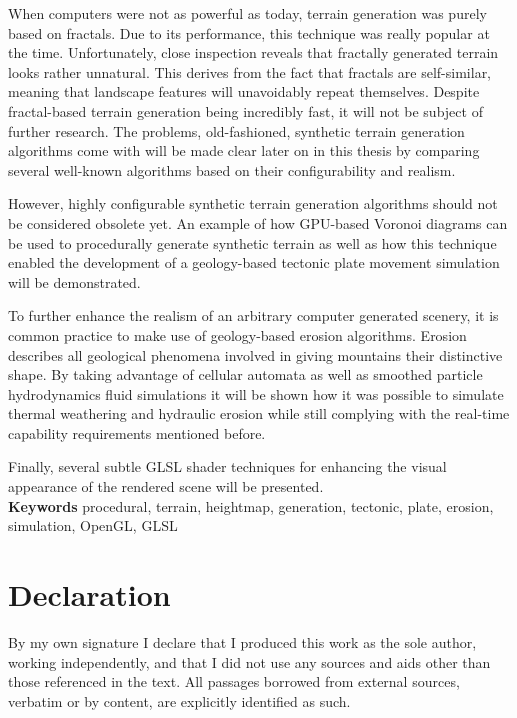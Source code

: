 \documentclass[11pt,a4paper,twoside,openright]{report}
\begin{document}
When computers were not as powerful as today, terrain generation was purely based on fractals. Due to its performance, this technique was really popular at the time. Unfortunately, close inspection reveals that fractally generated terrain looks rather unnatural. This derives from the fact that fractals are self-similar, meaning that landscape features will unavoidably repeat themselves. Despite fractal-based terrain generation being incredibly fast, it will not be subject of further research. The problems, old-fashioned, synthetic terrain generation algorithms come with will be made clear later on in this thesis by comparing several well-known algorithms based on their configurability and realism.

However, highly configurable synthetic terrain generation algorithms should not be considered obsolete yet. An example of how GPU-based Voronoi diagrams can be used to procedurally generate synthetic terrain as well as how this technique enabled the development of a geology-based tectonic plate movement simulation will be demonstrated.

To further enhance the realism of an arbitrary computer generated scenery, it is common practice to make use of geology-based erosion algorithms. Erosion describes all geological phenomena involved in giving mountains their distinctive shape. By taking advantage of cellular automata as well as smoothed particle hydrodynamics fluid simulations it will be shown how it was possible to simulate thermal weathering and hydraulic erosion while still complying with the real-time capability requirements mentioned before.

Finally, several subtle GLSL shader techniques for enhancing the visual appearance of the rendered scene will be presented.
\medskip
\noindent \\\textbf{Keywords} procedural, terrain, heightmap, generation, tectonic, plate, erosion, simulation, OpenGL, GLSL



\tableofcontents
\listoffigures
\listoftables


\chapter*{Declaration}
By my own signature I declare that I produced this work as the sole author, working independently,
and that I did not use any sources and aids other than those referenced in the text.
All passages borrowed from external sources, verbatim or by content, are explicitly identified as
such.\\
\end{document}
